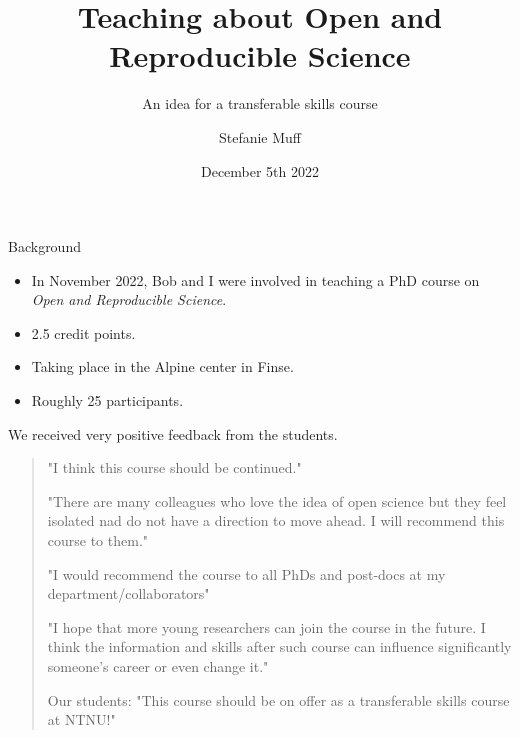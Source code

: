 \documentclass[
  10pt,
  ignorenonframetext,
]{beamer}
\title{Teaching about Open and Reproducible Science}
\subtitle{An idea for a transferable skills course}
\author{Stefanie Muff}
\date{December 5th 2022}
\providecommand{\tightlist}{%
  \setlength{\itemsep}{0pt}\setlength{\parskip}{0pt}}
\begin{document}
\frame{\titlepage}

\begin{frame}{Background}
\protect\hypertarget{background}{}
\(~\)

\begin{itemize}
\tightlist
\item
  In November 2022, Bob and I were involved in teaching a PhD course on
  \emph{Open and Reproducible Science}.
\end{itemize}

\vspace{2mm}

\begin{itemize}
\tightlist
\item
  2.5 credit points.
\end{itemize}

\vspace{2mm}

\begin{itemize}
\tightlist
\item
  Taking place in the Alpine center in Finse.
\end{itemize}

\vspace{2mm}

\begin{itemize}
\tightlist
\item
  Roughly 25 participants.
\end{itemize}
\end{frame}

\begin{frame}
We received very positive feedback from the students.

\vspace{4mm}

\begin{quote}

 "I think this course should be continued."
 
 \vspace{2mm}

 "There are many colleagues who love the idea of open science but they feel isolated nad do not have a direction to move ahead. I will recommend this course to them."
 
  \vspace{2mm}

 "I would recommend the course to all PhDs and post-docs at my department/collaborators"
 
 \vspace{2mm}
 
 "I hope that more young researchers can join the course in the future. I think the information and skills after such course can influence significantly someone's career or even change it."
 
  \vspace{2mm}
  
  Our students: "This course should be on offer as a transferable skills course at NTNU!" 

\end{quote}
\end{frame}
\end{document}
